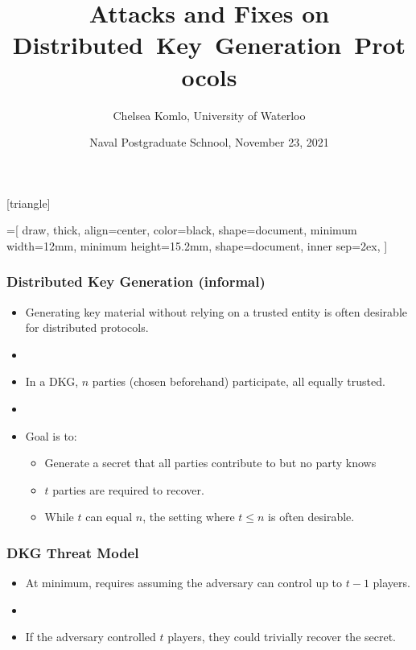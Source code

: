 \documentclass[hyperref={pdfpagelabels=true},table,dvipsnames,14pt,aspectratio=169]{beamer}
\title{Attacks and Fixes on Distributed~Key~Generation~Protocols}
\author{Chelsea Komlo, University of Waterloo}
\date[November 2021]{ Naval Postgraduate Schnool, November 23, 2021}
\begin{document}
[triangle]

=[%
draw,
thick,
align=center,
color=black,
shape=document,
minimum width=12mm,
minimum height=15.2mm,
shape=document,
inner sep=2ex,
]

\begin{frame}
        \thispagestyle{empty}
        \maketitle
\end{frame}


\begin{frame}
  \frametitle{Distributed Key Generation (informal)}

  \begin{itemize}
    \item<1-> Generating key material without relying on a trusted entity is often desirable for distributed protocols.
    \item[]
    \item<2-> In a DKG, $n$ parties (chosen beforehand) participate, all equally trusted.
    \item[]
    \item<3-> Goal is to:
  \begin{itemize}
    \item<4-> Generate a secret that all parties contribute to but no party knows
    \item<5-> $t$ parties are required to recover.
    \item<6-> While $t$ can equal $n$, the setting where $t \leq n$ is often desirable.
  \end{itemize}
  \end{itemize}
\end{frame}

\begin{frame}
  \frametitle{DKG Threat Model}

  \begin{itemize}
    \item<1-> At minimum, requires assuming the adversary can control up to $t-1$ players.
    \item[]
    \item<2-> If the adversary controlled $t$ players, they could trivially recover the secret.
  \end{itemize}
\end{frame}
\end{document}
